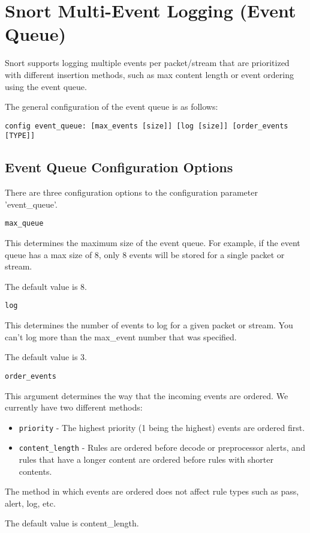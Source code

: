 \documentclass[english]{report}
\newcounter{slistnum}
\newenvironment{slist}
{ \begin{list}{ {\bf \arabic{slistnum}.} }{\usecounter{slistnum} } }
{ \end{list} }
\begin{document}
\clearpage
\section{Snort Multi-Event Logging (Event Queue)\label{eventqueue}}

Snort supports logging multiple events per packet/stream that are prioritized
with different insertion methods, such as max content length or event
ordering using the event queue.

The general configuration of the event queue is as follows:

\begin{verbatim}
config event_queue: [max_events [size]] [log [size]] [order_events [TYPE]]
\end{verbatim}

\subsection{Event Queue Configuration Options}

There are three configuration options to the configuration parameter
'event\_queue'.

\begin{slist}
\item \texttt{max\_queue}

This determines the maximum size of the event queue.  For example, if the
event queue has a max size of 8, only 8 events will be stored for a single
packet or stream.

The default value is 8.

\item \texttt{log}

This determines the number of events to log for a given packet or stream.
You can't log more than the max\_event number that was specified.

The default value is 3.

\item \texttt{order\_events}

This argument determines the way that the incoming events are ordered.  We
currently have two different methods:

\begin{itemize}
  \item \texttt{priority} - The highest priority (1 being the highest) events are ordered
    first.

  \item \texttt{content\_length} - Rules are ordered before decode or preprocessor alerts,
    and rules that have a longer content are ordered before rules with
    shorter contents.
\end{itemize}

The method in which events are ordered does not affect rule types such as
pass, alert, log, etc.

The default value is content\_length.
\end{slist}
\end{document}
